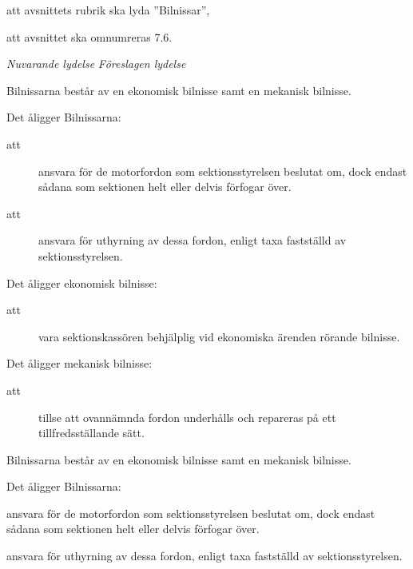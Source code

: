 \documentclass{article}
\newenvironment{lydelse}
    {\begin{paracol}{2}%
        \emph{Nuvarande lydelse}%
        \switchcolumn%
        \emph{Föreslagen lydelse}%
    \end{paracol}%
    \begin{enumerate}[label=\thesubsection.\arabic*]%
    \begin{paracol}{2}%
    }{\end{paracol}\end{enumerate}}
\begin{document}
\begin{dels}
    \item att avsnittets rubrik ska lyda ''Bilnissar'',
    \item att avsnittet ska omnumreras 7.6.
\end{dels}
\begin{lydelse}
    \setcounter{section}{8}
    \setcounter{subsection}{7}
    
    \item Bilnissarna består av en ekonomisk bilnisse samt en mekanisk bilnisse.

	\item Det åligger Bilnissarna:
	\begin{description}
		\item[att] ansvara för de motorfordon som sektionsstyrelsen beslutat om, dock endast sådana som sektionen helt eller delvis förfogar över.
		\item[att] ansvara för uthyrning av dessa fordon, enligt taxa fastställd av sektionsstyrelsen.
	\end{description}

	\item Det åligger ekonomisk bilnisse:
	\begin{description}
		\item[att] vara sektionskassören behjälplig vid ekonomiska ärenden rörande bilnisse.
	\end{description}

	\item Det åligger mekanisk bilnisse:
	\begin{description}
		\item[att] tillse att ovannämnda fordon underhålls och repareras på ett tillfredsställande sätt.
	\end{description}
    
    \setcounter{section}{7}
    \setcounter{subsection}{6}
    \switchcolumn
    
    \item Bilnissarna består av en ekonomisk bilnisse samt en mekanisk bilnisse.

    \item Det åligger Bilnissarna:
    \begin{aligganden}
        \vspace{-0.4em}
        \item ansvara för de motorfordon som sektionsstyrelsen beslutat om, dock endast sådana som sektionen helt eller delvis förfogar över.\vspace{0.4em}
        \item ansvara för uthyrning av dessa fordon, enligt taxa fastställd av sektionsstyrelsen.
    \end{aligganden}
    

\end{lydelse}
\end{document}
